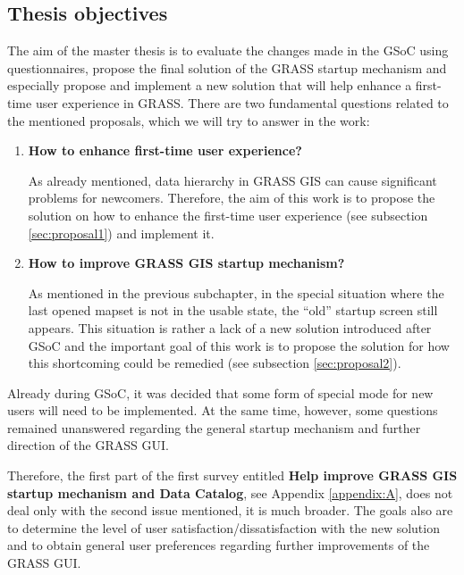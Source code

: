 \documentclass[a4paper,10pt,twoside]{article}
\begin{document}
\newpage
\vspace*{-1cm}
\subsection{Thesis objectives}
\label{sec:objectives}

The aim of the master thesis is to evaluate the changes made in the GSoC using questionnaires, propose the final solution of the GRASS startup mechanism and especially propose and implement a new solution that will help enhance a first-time user experience in GRASS. There are two fundamental questions related to the mentioned proposals, which we will try to answer in the work:

\begin{enumerate}

\item  \noindent \textbf{How to enhance first-time user experience?}

\noindent As already mentioned, data hierarchy in GRASS GIS can cause significant problems for newcomers. Therefore, the aim of this work is to propose the solution on how to enhance the first-time user experience (see subsection \ref{sec:proposal1})  and implement it.


\item \noindent \textbf{How to improve GRASS GIS startup mechanism?}

As mentioned in the previous subchapter, in the special situation where the last opened mapset is not in the usable state, the ``old'' startup screen still appears. This situation is rather a lack of a new solution introduced after GSoC and the important goal of this work is to propose the solution for how this shortcoming could be remedied (see subsection \ref{sec:proposal2}).

\end{enumerate}

\noindent Already during GSoC, it was decided that some form of special mode for new users will need to be implemented. At the same time, however, some questions remained unanswered regarding the general startup mechanism and further direction of the GRASS GUI. 

Therefore, the first part of the first survey entitled \textbf {Help improve GRASS GIS startup mechanism and Data Catalog}, see Appendix \ref{appendix:A}, does not deal only with the second issue mentioned, it is much broader. The goals also are to determine the level of user satisfaction/dissatisfaction with the new solution and to obtain general user preferences regarding further improvements of the GRASS GUI.
\end{document}
